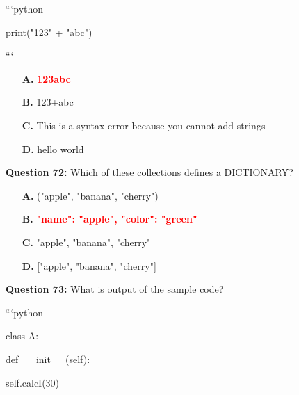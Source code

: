 \documentclass[12pt,a4paper]{article}
\begin{document}
\newline
```python\newline

\newline
print("123" + "abc")\newline

\newline
```

\begin{itemize}
    \item[\textbf{A.}] \textcolor{red}{\textbf{123abc}}
    \item[\textbf{B.}] 123+abc
    \item[\textbf{C.}] This is a syntax error because you cannot add strings
    \item[\textbf{D.}] hello world
\end{itemize}

\vspace{0.5cm}

\textbf{Question 72:} Which of these collections defines a DICTIONARY?

\begin{itemize}
    \item[\textbf{A.}] ("apple", "banana", "cherry")
    \item[\textbf{B.}] \textcolor{red}{\textbf{"name": "apple", "color": "green"}}
    \item[\textbf{C.}] "apple", "banana", "cherry"
    \item[\textbf{D.}] ["apple", "banana", "cherry"]
\end{itemize}

\vspace{0.5cm}

\textbf{Question 73:} What is output of the sample code?\newline

\newline
\newline

\newline
```python\newline

\newline
class A:\newline

\newline
    def __init__(self):\newline

\newline
        self.calcI(30)\newline
\end{document}
